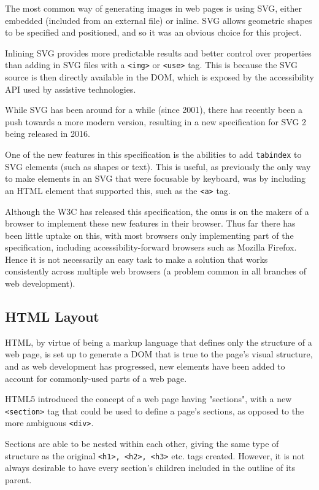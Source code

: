 \documentclass[ %
                    author={Aleena Baig},
                supervisor={Dr Simon Lock},
                    degree={BSc},
                     title={On Making Web Accessible Graphs},
                  subtitle={},
                      year={2019} ]{dissertation}
\begin{document}
The most common way of generating images in web pages is using SVG, either embedded (included from an external file) or inline. SVG allows geometric shapes to be specified and positioned, and so it was an obvious choice for this project.

Inlining SVG provides more predictable results and better control over properties than adding in SVG files with a \texttt{<img>} or \texttt{<use>} tag. This is because the SVG source is then directly available in the DOM, which is exposed by the accessibility API used by assistive technologies.

While SVG has been around for a while (since 2001), there has recently been a push towards a more modern version, resulting in a new specification for SVG 2 being released in 2016.

One of the new features in this specification is the abilities to add \texttt{tabindex} to SVG elements (such as shapes or text). This is useful, as previously the only way to make elements in an SVG that were focusable by keyboard, was by including an HTML element that supported this, such as the \texttt{<a>} tag.

Although the W3C has released this specification, the onus is on the makers of a browser to implement these new features in their browser. Thus far there has been little uptake on this, with most browsers only implementing part of the specification, including accessibility-forward browsers such as Mozilla Firefox. Hence it is not necessarily an easy task to make a solution that works consistently across multiple web browsers (a problem common in all branches of web development).

\subsection{HTML Layout}

HTML, by virtue of being a markup language that defines only the structure of a web page, is set up to generate a DOM that is true to the page's visual structure, and as web development has progressed, new elements have been added to account for commonly-used parts of a web page.

HTML5 introduced the concept of a web page having "sections", with a new \texttt{<section>} tag that could be used to define a page's sections, as opposed to the more ambiguous \texttt{<div>}.

Sections are able to be nested within each other, giving the same type of structure as the original \texttt{<h1>, <h2>, <h3>} etc. tags created. However, it is not always desirable to have every section's children included in the outline of its parent.
\end{document}
